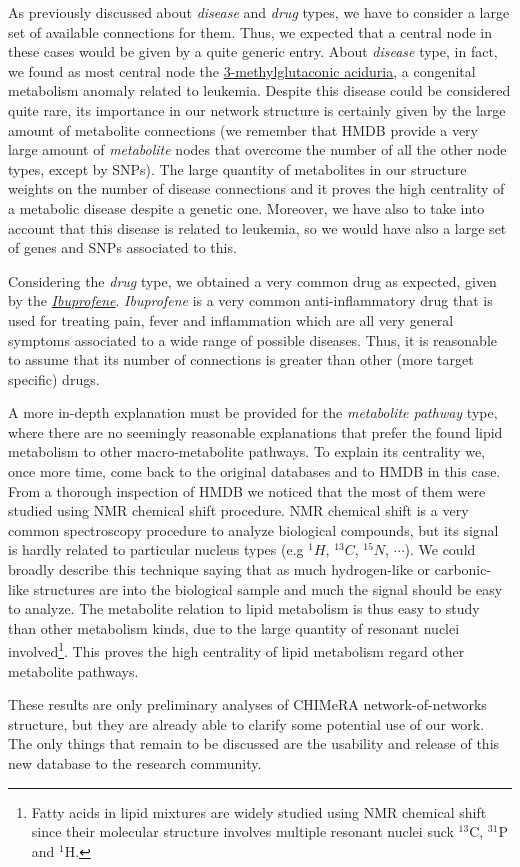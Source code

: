 \documentclass{standalone}
\begin{document}
As previously discussed about \emph{disease} and \emph{drug} types, we have to consider a large set of available connections for them.
Thus, we expected that a central node in these cases would be given by a quite generic entry.
About \emph{disease} type, in fact, we found as most central node the \href{https://en.wikipedia.org/wiki/3-Methylglutaconic_aciduria}{\textsf{3-methylglutaconic aciduria}}, a congenital metabolism anomaly related to leukemia.
Despite this disease could be considered quite rare, its importance in our network structure is certainly given by the large amount of metabolite connections (we remember that HMDB provide a very large amount of \emph{metabolite} nodes that overcome the number of all the other node types, except by SNPs).
The large quantity of metabolites in our structure weights on the number of disease connections and it proves the high centrality of a metabolic disease despite a genetic one.
Moreover, we have also to take into account that this disease is related to leukemia, so we would have also a large set of genes and SNPs associated to this.

Considering the \emph{drug} type, we obtained a very common drug as expected, given by the \href{https://en.wikipedia.org/wiki/Ibuprofen}{\emph{Ibuprofene}}.
\emph{Ibuprofene} is a very common anti-inflammatory drug that is used for treating pain, fever and inflammation which are all very general symptoms associated to a wide range of possible diseases.
Thus, it is reasonable to assume that its number of connections is greater than other (more target specific) drugs.

A more in-depth explanation must be provided for the \emph{metabolite pathway} type, where there are no seemingly reasonable explanations that prefer the found \textsf{lipid metabolism} to other macro-metabolite pathways.
To explain its centrality we, once more time, come back to the original databases and to HMDB in this case.
From a thorough inspection of HMDB we noticed that the most of them were studied using NMR chemical shift procedure.
NMR chemical shift is a very common spectroscopy procedure to analyze biological compounds, but its signal is hardly related to particular nucleus types (e.g $^1H$, $^{13}C$, $^{15}N$, $\cdots$).
We could broadly describe this technique saying that as much hydrogen-like or carbonic-like structures are into the biological sample and much the signal should be easy to analyze.
The metabolite relation to lipid metabolism is thus easy to study than other metabolism kinds, due to the large quantity of resonant nuclei involved\footnote{
  Fatty acids in lipid mixtures are widely studied using NMR chemical shift since their molecular structure involves multiple resonant nuclei suck $^{13}$C, $^{31}$P and $^1$H.
}.
This proves the high centrality of \textsf{lipid metabolism} regard other metabolite pathways.

These results are only preliminary analyses of \textsf{CHIMeRA} network-of-networks structure, but they are already able to clarify some potential use of our work.
The only things that remain to be discussed are the usability and release of this new database to the research community.
\end{document}
